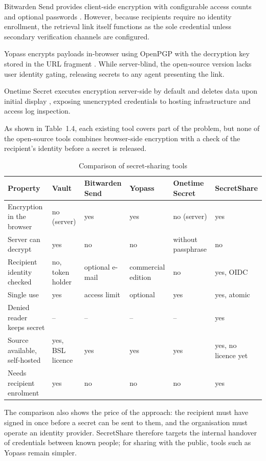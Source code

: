 \documentclass[12pt,a4paper]{article}
\numberwithin{equation}{section}
\numberwithin{figure}{section}
\numberwithin{table}{section}
\newcommand{\tablesetup}{\fontsize{11pt}{13pt}\selectfont\singlespacing\renewcommand{\arraystretch}{1.15}}
\newcommand{\leadin}[1]{%
  {\onehalfspacing\setlength{\parindent}{1.25cm}\indent #1\par}\vspace{8pt}}
\begin{document}
Bitwarden Send provides client-side encryption with configurable access counts and optional passwords \cite{bitwardensend}. However, because recipients require no identity enrollment, the retrieval link itself functions as the sole credential unless secondary verification channels are configured.

Yopass encrypts payloads in-browser using OpenPGP with the decryption key stored in the URL fragment \cite{yopass}. While server-blind, the open-source version lacks user identity gating, releasing secrets to any agent presenting the link.

Onetime Secret executes encryption server-side by default and deletes data upon initial display \cite{onetimesecret}, exposing unencrypted credentials to hosting infrastructure and access log inspection.

\begin{table}[H]
\leadin{As shown in Table~1.4, each existing tool covers part of the problem, but none of the open-source tools combines browser-side encryption with a check of the recipient's identity before a secret is released.}
\tablesetup
\caption{Comparison of secret-sharing tools}
\label{tab:market}
\begin{tabularx}{\textwidth}{|L|P{0.12\textwidth}|P{0.13\textwidth}|P{0.12\textwidth}|P{0.14\textwidth}|P{0.13\textwidth}|}
\hline
\textbf{Property} & \textbf{Vault} & \textbf{Bitwarden Send} & \textbf{Yopass} & \textbf{Onetime Secret} & \textbf{SecretShare} \\ \hline
Encryption in the browser & no (server) & yes & yes & no (server) & yes \\ \hline
Server can decrypt & yes & no & no & without passphrase & no \\ \hline
Recipient identity checked & no, token holder & optional e-mail & commercial edition & no & yes, OIDC \\ \hline
Single use & yes & access limit & optional & yes & yes, atomic \\ \hline
Denied reader keeps secret & -- & -- & -- & -- & yes \\ \hline
Source available, self-hosted & yes, BSL licence & yes & yes & yes & yes, no licence yet \\ \hline
Needs recipient enrolment & yes & no & no & no & yes \\ \hline
\end{tabularx}
\end{table}

The comparison also shows the price of the approach: the recipient must have signed in once before a secret can be sent to them, and the organisation must operate an identity provider. SecretShare therefore targets the internal handover of credentials between known people; for sharing with the public, tools such as Yopass remain simpler.
\end{document}

